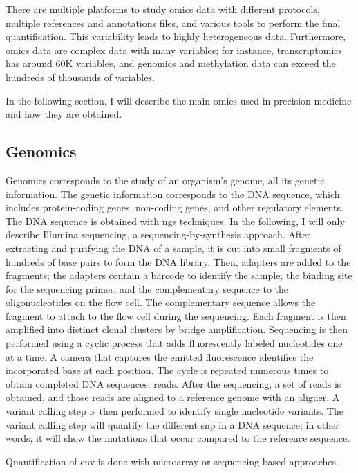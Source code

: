 \documentclass[../main.tex]{subfiles}
\begin{document}
 There are multiple platforms to study omics data with different protocols, multiple references and annotations files, and various tools to perform the final quantification.
 This variability leads to highly heterogeneous data.
 Furthermore, omics data are complex data with many variables; for instance, transcriptomics has around 60K variables, and genomics and methylation data can exceed the hundreds of thousands of variables.

 In the following section, I will describe the main omics used in precision medicine and how they are obtained.

 \subsection{Genomics}\label{subsec:genomics}
	 Genomics corresponds to the study of an organism's genome, \ie{}all its genetic information.
	 The genetic information corresponds to the DNA sequence, which includes protein-coding genes, non-coding genes, and other regulatory elements.
	 The DNA sequence is obtained with \gls{ngs} techniques.
	 In the following, I will only describe Illumina sequencing, a sequencing-by-synthesis approach.
	 After extracting and purifying the DNA of a sample, it is cut into small fragments of hundreds of base pairs to form the DNA library.
	 Then, adapters are added to the fragments; the adapters contain a barcode to identify the sample, the binding site for the sequencing primer, and the complementary sequence to the oligonucleotides on the flow cell.
	 The complementary sequence allows the fragment to attach to the flow cell during the sequencing.
	 Each fragment is then amplified into distinct clonal clusters by bridge amplification.
	 Sequencing is then performed using a cyclic process that adds fluorescently labeled nucleotides one at a time.
	 A camera that captures the emitted fluorescence identifies the incorporated base at each position.
	 The cycle is repeated numerous times to obtain completed DNA sequences: reads.
	 After the sequencing, a set of reads is obtained, and those reads are aligned to a reference genome with an aligner.
	 A variant calling step is then performed to identify single nucleotide variants.
	 The variant calling step will quantify the different \gls{snp} in a DNA sequence; in other words, it will show the mutations that occur compared to the reference sequence.

	 Quantification of \gls{cnv} is done with microarray or sequencing-based approaches.
\end{document}
